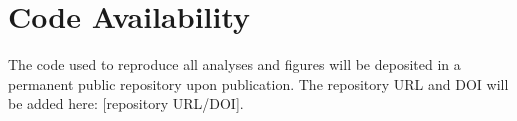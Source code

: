 \section*{Code Availability}

The code used to reproduce all analyses and figures will be deposited in a permanent public repository upon publication. The repository URL and DOI will be added here: [repository URL/DOI].

